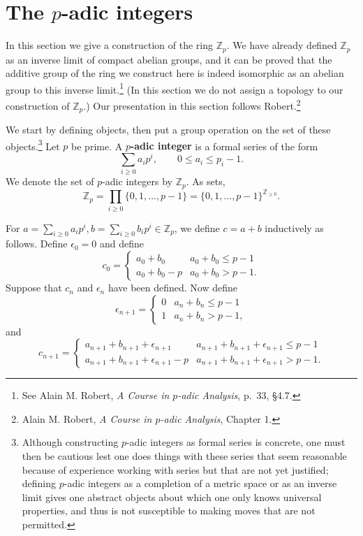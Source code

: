 \documentclass{article}
\theoremstyle{definition}
\begin{document}
\section{The $p$-adic integers}
In this section we give a construction of the  ring $\mathbb{Z}_p$. We have already defined
$\mathbb{Z}_p$ as an inverse limit of compact abelian groups, and it can be proved that
the additive group of the 
ring we construct here is indeed isomorphic as an abelian group  to this inverse limit.\footnote{See Alain M. Robert, {\em A Course in $p$-adic Analysis},
p.~33, \S 4.7.}
(In this section we do not  assign a topology to our construction of $\mathbb{Z}_p$.)
Our presentation in this section follows Robert.\footnote{Alain M. Robert, {\em A Course in $p$-adic Analysis},
Chapter 1.}

We start by defining objects, then put a group operation on the set of these objects.\footnote{Although constructing $p$-adic integers as formal
series is concrete, one must then be cautious lest one does things with these series that seem reasonable because of experience working with series
but that are not yet justified; defining $p$-adic integers as a completion of a metric space or as an inverse limit gives one abstract objects about which
one only knows universal properties, and thus is not susceptible to making moves that are not permitted.}
Let $p$ be prime.
A \textbf{$p$-adic integer} is a formal  series of the form
\[
\sum_{i \geq 0} a_i p^i, \qquad 0 \leq a_i \leq p_i-1.
\]
We denote the set of $p$-adic integers by $\mathbb{Z}_p$. As sets,
\[
\mathbb{Z}_p = \prod_{i \geq 0} \{0,1,\ldots,p-1\} = \{0,1,\ldots,p-1\}^{\mathbb{Z}_{\geq 0}}.
\]

For $a=\sum_{i \geq 0} a_i p^i, b=\sum_{i \geq 0} b_i p^i \in \mathbb{Z}_p$, we define
$c=a+b$ inductively as follows. Define $\epsilon_0=0$ and define
\[
c_0 = \begin{cases}
a_0+b_0&a_0+b_0 \leq p-1\\
a_0+b_0-p&a_0+b_0>p-1.
\end{cases}
\]
Suppose that $c_n$ and $\epsilon_n$ have been defined. Now define
\[
\epsilon_{n+1} = \begin{cases}
0&a_n+b_n \leq p-1\\
1&a_n+b_n>p-1,
\end{cases}
\]
and
\[
c_{n+1} = \begin{cases}
a_{n+1}+b_{n+1}+\epsilon_{n+1}&a_{n+1}+b_{n+1}+\epsilon_{n+1} \leq p-1\\
a_{n+1}+b_{n+1}+\epsilon_{n+1}-p&a_{n+1}+b_{n+1}+\epsilon_{n+1} > p-1.
\end{cases}
\]
\end{document}
